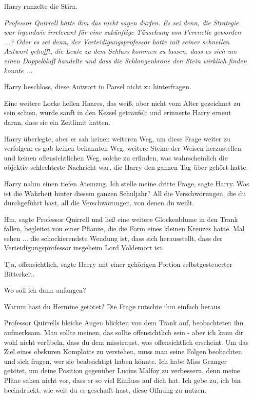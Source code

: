 Harry runzelte die Stirn.

\emph{Professor Quirrell hätte ihm das nicht sagen dürfen. Es sei denn, die
Strategie war irgendwie irrelevant für eine zukünftige Täuschung von Perenelle
geworden ...? Oder es sei denn, der Verteidigungsprofessor hatte mit seiner
schnellen Antwort gehofft, die Leute zu dem Schluss kommen zu lassen, dass es
sich um einen Doppelbluff handelte und dass die Schlangenkrone den Stein
wirklich finden konnte ...}

Harry beschloss, diese Antwort in Parsel nicht zu hinterfragen.

Eine weitere Locke hellen Haares, das weiß, aber nicht vom Alter gezeichnet zu
sein schien, wurde sanft in den Kessel geträufelt und erinnerte Harry erneut
daran, dass sie ein Zeitlimit hatten.

Harry überlegte, aber er sah keinen weiteren Weg, um diese Frage weiter zu
verfolgen; es gab keinen bekannten Weg, weitere Steine der Weisen herzustellen
und keinen offensichtlichen Weg, solche zu erfinden, was wahrscheinlich die
objektiv schlechteste Nachricht war, die Harry den ganzen Tag über gehört hatte.

Harry nahm einen tiefen Atemzug. \glqq{}Ich stelle meine dritte Frage\grqq{},
sagte Harry. \glqq{}Was ist die Wahrheit hinter diesem ganzen Schuljahr? All die
Verschwörungen, die du durchgeführt hast, all die Verschwörungen, von denen du
weißt.\grqq{}

\glqq{}Hm\grqq{}, sagte Professor Quirrell und ließ eine weitere Glockenblume in
den Trank fallen, begleitet von einer Pflanze, die die Form eines kleinen
Kreuzes hatte. \glqq{}Mal sehen ... die schockierendste Wendung ist, dass sich
herausstellt, dass der Verteidigungsprofessor insgeheim Lord Voldemort ist.\grqq{}

\glqq{}Tja, offensichtlich\grqq{}, sagte Harry mit einer gehörigen Portion
selbstgesteuerter Bitterkeit.

\glqq{}Wo soll ich dann anfangen?\grqq{}

\glqq{}Warum hast du Hermine getötet?\grqq{} Die Frage rutschte ihm einfach heraus.

Professor Quirrells bleiche Augen blickten von dem Trank auf, beobachteten ihn
aufmerksam. \glqq{}Man sollte meinen, das sollte offensichtlich sein - aber ich
kann dir wohl nicht verübeln, dass du dem misstraust, was offensichtlich
erscheint. Um das Ziel eines obskuren Komplotts zu verstehen, muss man seine
Folgen beobachten und sich fragen, wer sie beabsichtigt haben könnte. Ich habe
Miss Granger getötet, um deine Position gegenüber Lucius Malfoy zu verbessern,
denn meine Pläne sahen nicht vor, dass er so viel Einfluss auf dich hat. Ich
gebe zu, ich bin beeindruckt, wie weit du es geschafft hast, diese Öffnung zu
nutzen.\grqq{}


